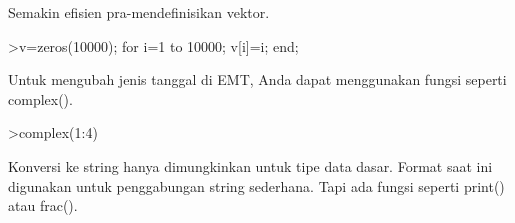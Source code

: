 \documentclass[a4paper,10pt]{article}
\begin{document}
\begin{eulernotebook}
\begin{eulercomment}
\begin{eulercomment}
\begin{eulercomment}
\begin{eulercomment}
\begin{eulercomment}
\begin{eulercomment}
\begin{eulercomment}
\begin{eulercomment}
\begin{eulercomment}
\begin{eulercomment}
\begin{eulercomment}
\begin{eulercomment}
\begin{eulercomment}
\begin{eulercomment}
\begin{eulercomment}
\begin{eulercomment}
\begin{eulercomment}
\begin{eulercomment}
\begin{eulercomment}
Semakin efisien pra-mendefinisikan vektor.
\end{eulercomment}
\begin{eulerprompt}
>v=zeros(10000); for i=1 to 10000; v[i]=i; end;
\end{eulerprompt}
\begin{eulercomment}
Untuk mengubah jenis tanggal di EMT, Anda dapat menggunakan fungsi
seperti complex().
\end{eulercomment}
\begin{eulerprompt}
>complex(1:4)
\end{eulerprompt}
\begin{euleroutput}
  [ 1+0i ,  2+0i ,  3+0i ,  4+0i  ]
\end{euleroutput}
\begin{eulercomment}
Konversi ke string hanya dimungkinkan untuk tipe data dasar. Format
saat ini digunakan untuk penggabungan string sederhana. Tapi ada
fungsi seperti print() atau frac().


\end{eulercomment}
\end{eulercomment}
\end{eulercomment}
\end{eulercomment}
\end{eulercomment}
\end{eulercomment}
\end{eulercomment}
\end{eulercomment}
\end{eulercomment}
\end{eulercomment}
\end{eulercomment}
\end{eulercomment}
\end{eulercomment}
\end{eulercomment}
\end{eulercomment}
\end{eulercomment}
\end{eulercomment}
\end{eulercomment}
\end{eulercomment}
\end{eulernotebook}
\end{document}
